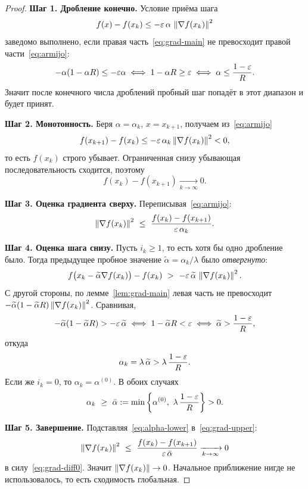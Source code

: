 \begin{proof}
\textbf{Шаг 1. Дробление конечно.} Условие приёма шага
\begin{equation}\label{eq:armijo}
  f(x) - f(x_k) \le -\varepsilon\,\alpha\,\left\lVert \nabla f(x_k) \right\rVert^2
\end{equation}
заведомо выполнено, если правая часть~\eqref{eq:grad-main} не превосходит
правой части~\eqref{eq:armijo}:
\[
  -\alpha(1-\alpha R) \le -\varepsilon\alpha
  \iff 1 - \alpha R \ge \varepsilon
  \iff \alpha \le \frac{1-\varepsilon}{R} .
\]
Значит после конечного числа дроблений пробный шаг попадёт в этот диапазон и
будет принят.

\medskip
\textbf{Шаг 2. Монотонность.} Беря $\alpha = \alpha_k$, $x = x_{k+1}$,
получаем из~\eqref{eq:armijo}
\[
  f(x_{k+1}) - f(x_k) \le -\varepsilon\,\alpha_k \left\lVert \nabla f(x_k) \right\rVert^2 < 0 ,
\]
то есть $f(x_k)$ строго убывает. Ограниченная снизу убывающая
последовательность сходится, поэтому
\begin{equation}\label{eq:grad-diff0}
  f(x_k) - f(x_{k+1}) \xrightarrow[k \to \infty]{} 0 .
\end{equation}

\medskip
\textbf{Шаг 3. Оценка градиента сверху.} Переписывая~\eqref{eq:armijo}:
\begin{equation}\label{eq:grad-upper}
  \left\lVert \nabla f(x_k) \right\rVert^2 \ \le\ \frac{f(x_k) - f(x_{k+1})}{\varepsilon\,\alpha_k} .
\end{equation}

\medskip
\textbf{Шаг 4. Оценка шага снизу.} Пусть $i_k \ge 1$, то есть хотя бы одно
дробление было. Тогда предыдущее пробное значение
$\widetilde\alpha = \alpha_k/\lambda$ было \emph{отвергнуто}:
\[
  f\big(x_k - \widetilde\alpha \nabla f(x_k)\big) - f(x_k)
  \ >\ -\varepsilon\,\widetilde\alpha\,\left\lVert \nabla f(x_k) \right\rVert^2 .
\]
С другой стороны, по лемме~\ref{lem:grad-main} левая часть не превосходит
$-\widetilde\alpha(1 - \widetilde\alpha R)\left\lVert \nabla f(x_k) \right\rVert^2$. Сравнивая,
\[
  -\widetilde\alpha(1 - \widetilde\alpha R) > -\varepsilon\,\widetilde\alpha
  \iff 1 - \widetilde\alpha R < \varepsilon
  \iff \widetilde\alpha > \frac{1-\varepsilon}{R} ,
\]
откуда
\[
  \alpha_k = \lambda\,\widetilde\alpha > \lambda\,\frac{1-\varepsilon}{R} .
\]
Если же $i_k = 0$, то $\alpha_k = \alpha^{(0)}$. В обоих случаях
\begin{equation}\label{eq:alpha-lower}
  \alpha_k \ \ge\ \bar\alpha := \min\left\{\alpha^{(0)},\ \lambda\,\frac{1-\eps}{R}\right\} > 0 .
\end{equation}

\medskip
\textbf{Шаг 5. Завершение.} Подставляя~\eqref{eq:alpha-lower}
в~\eqref{eq:grad-upper}:
\[
  \left\lVert \nabla f(x_k) \right\rVert^2
  \ \le\ \frac{f(x_k) - f(x_{k+1})}{\varepsilon\,\bar\alpha}
  \xrightarrow[k \to \infty]{} 0
\]
в силу~\eqref{eq:grad-diff0}. Значит $\left\lVert \nabla f(x_k) \right\rVert \to 0$. Начальное
приближение нигде не использовалось, то есть сходимость глобальная.
\end{proof}

